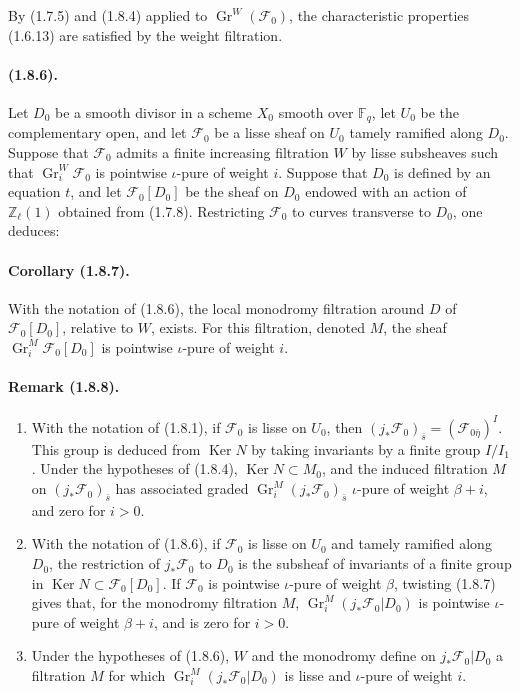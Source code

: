 \documentclass[11pt]{article}
\theoremstyle{remark}
\newcommand{\ZZ}{\mathbb{Z}}
\newcommand{\Fq}{\mathbb{F}_q}
\newcommand{\Gr}{\operatorname{Gr}}
\newcommand{\Ker}{\operatorname{Ker}}
\begin{document}
By (1.7.5) and (1.8.4) applied to $\Gr^W(\mathcal F_0)$, the characteristic properties (1.6.13) are satisfied by the weight filtration.

\paragraph{(1.8.6).}
Let $D_0$ be a smooth divisor in a scheme $X_0$ smooth over $\Fq$, let $U_0$ be the complementary open, and let $\mathcal F_0$ be a lisse sheaf on $U_0$ tamely ramified along $D_0$. Suppose that $\mathcal F_0$ admits a finite increasing filtration $W$ by lisse subsheaves such that $\Gr^W_i\mathcal F_0$ is pointwise $\iota$-pure of weight $i$. Suppose that $D_0$ is defined by an equation $t$, and let $\mathcal F_0[D_0]$ be the sheaf on $D_0$ endowed with an action of $\ZZ_\ell(1)$ obtained from (1.7.8). Restricting $\mathcal F_0$ to curves transverse to $D_0$, one deduces:

\paragraph{Corollary (1.8.7).}
With the notation of (1.8.6), the local monodromy filtration around $D$ of $\mathcal F_0[D_0]$, relative to $W$, exists. For this filtration, denoted $M$, the sheaf $\Gr^M_i\mathcal F_0[D_0]$ is pointwise $\iota$-pure of weight $i$.

\paragraph{Remark (1.8.8).}
\begin{enumerate}[label=\arabic*)]
\item With the notation of (1.8.1), if $\mathcal F_0$ is lisse on $U_0$, then $(j_*\mathcal F_0)_{\bar s}=(\mathcal F_{0\bar\eta})^I$. This group is deduced from $\Ker N$ by taking invariants by a finite group $I/I_1$. Under the hypotheses of (1.8.4), $\Ker N\subset M_0$, and the induced filtration $M$ on $(j_*\mathcal F_0)_{\bar s}$ has associated graded $\Gr^M_i(j_*\mathcal F_0)_{\bar s}$ $\iota$-pure of weight $\beta+i$, and zero for $i>0$.
\item With the notation of (1.8.6), if $\mathcal F_0$ is lisse on $U_0$ and tamely ramified along $D_0$, the restriction of $j_*\mathcal F_0$ to $D_0$ is the subsheaf of invariants of a finite group in $\Ker N\subset\mathcal F_0[D_0]$. If $\mathcal F_0$ is pointwise $\iota$-pure of weight $\beta$, twisting (1.8.7) gives that, for the monodromy filtration $M$, $\Gr^M_i(j_*\mathcal F_0|D_0)$ is pointwise $\iota$-pure of weight $\beta+i$, and is zero for $i>0$.
\item Under the hypotheses of (1.8.6), $W$ and the monodromy define on $j_*\mathcal F_0|D_0$ a filtration $M$ for which $\Gr^M_i(j_*\mathcal F_0|D_0)$ is lisse and $\iota$-pure of weight $i$.
\end{enumerate}
\end{document}
